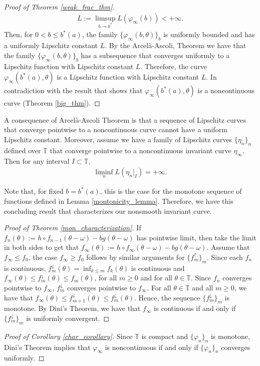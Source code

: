 \documentclass[12pt]{article}
\newcommand{\T}{\mathbb{T}}
\theoremstyle{plain}
\theoremstyle{remark}
\theoremstyle{definition}
\begin{document}
\begin{proof}[Proof of Theorem \ref{weak_frac_thm}]
    \begin{align*}
            L:=\limsup_{b\to b^*} L(\varphi_\infty(b)) < +\infty.
    \end{align*}
    Then, for $0<b\leq b^*(a)$, the family $\{\varphi_\infty(b,\theta)\}_{b}$ is uniformly bounded and has a uniformly Lipschitz constant $L$. By the Arcelà-Ascoli, Theorem we have that the family $\{\varphi_\infty(b,\theta)\}_{b}$ has a subsequence that converges uniformly to a Lipschitz function with Lipschitz constant $L$. Therefore, the curve $\varphi_\infty(b^*(a),\theta)$ is a Lipschitz function with Lipschitz constant $L$. In contradiction with the result that shows that $\varphi_\infty(b^*(a),\theta)$ is a noncontinuous curve (Theorem \ref{big_thm}).
\end{proof}

A consequence of Arcelà-Ascoli Theorem is that a sequence of Lipschitz curves that converge pointwise to a noncontinuous curve cannot have a uniform Lipschitz constant. Moreover, assume we have a family of Lipschitz curves $\{\eta_n\}_n$ defined over $\T$ that converge pointwise to a noncontinuous invariant curve $\eta_\infty$. Then for any interval $I\subset\T$,
    \begin{align*}
        \liminf_{n} L(\eta_n|_I) = +\infty.
    \end{align*}

Note that, for fixed $b=b^*(a)$, this is the case for the monotone sequence of functions defined in Lemma \ref{montonicity_lemma}. Therefore, we have this concluding result that characterizes our nonsmooth invariant curve.
\begin{proof}[Proof of Theorem \ref{mon_characterization}]
    If $f_n(\theta):=h\circ f_{n-1}(\theta-\omega)- b g(\theta-\omega)$ has pointwise limit, then take the limit in both sides to get that $f_\infty(\theta):=h\circ f_{\infty}(\theta-\omega)- b g(\theta-\omega)$.
    Assume that $f_\infty\leq f_0$, the case $f_\infty\geq f_0$ follows by similar arguments for $\{f_m^{\uparrow}\}_m$. Since each $f_n$ is continuous, $f_m^{\downarrow}(\theta)=\inf_{k\leq m}f_k(\theta)$ is continuous and $f_\infty(\theta)\leq f_{m}^{\downarrow}(\theta)\leq f_m(\theta)$, for all $m\geq0$ and for all $\theta\in\T$. Since $f_n$ converges pointwise to $f_\infty$, $f_m^{\downarrow}$ converges pointwise to $f_\infty$. For all $\theta\in\T$ and all $m\geq0$, we have that $f_\infty(\theta)\leq f_{m+1}^{\downarrow}(\theta)\leq f_m^{\downarrow}(\theta)$. Hence, the sequence $\{f_m^{\downarrow}\}_m$ is monotone. By Dini's Theorem, we have that $f_\infty$ is continuous if and only if $\{f_m^{\downarrow}\}_m$ is uniformly convergent.
\end{proof}
\begin{proof}[Proof of Corollary \ref{char_corollary}]
    Since $\T$ is compact and $\{\varphi_n\}_n$ is monotone, Dini's Theorem implies that $\varphi_\infty$ is noncontinuous if and only if $\{\varphi_n\}_n$ converges uniformly.
\end{proof}
\end{document}
